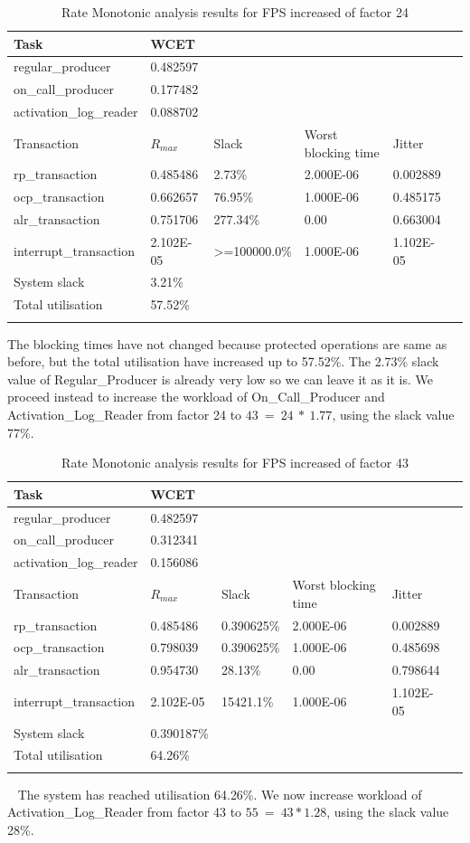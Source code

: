 \documentclass{article}
\begin{document}
\begin{longtable}{llllll}
   \toprule
   Task & WCET \\
   \midrule
   regular\_producer & 0.482597 \\
   on\_call\_producer & 0.177482 \\
   activation\_log\_reader & 0.088702 \\
   \toprule
   \toprule
   Transaction & $R_{max}$ & Slack & Worst blocking time & Jitter \\
   \midrule
   rp\_transaction & 0.485486  & 2.73\% &  2.000E-06 & 0.002889 \\
   ocp\_transaction & 0.662657 & 76.95\% & 1.000E-06 & 0.485175 \\
   alr\_transaction & 0.751706 & 277.34\% & 0.00 & 0.663004 \\
   interrupt\_transaction & 2.102E-05 & >=100000.0\% & 1.000E-06 & 1.102E-05 \\
   \toprule
   \toprule
   System slack & 3.21\% \\
   Total utilisation & 57.52\% \\
   \bottomrule
   \caption{Rate Monotonic analysis results for FPS increased of factor 24}
\label{tab:rm-fps-24}
\end{longtable}

The blocking times have not changed because protected operations are same as before, but the total utilisation have increased up to 57.52\%. The 2.73\% slack value of Regular\_Producer is already very low so we can leave it as it is. We proceed instead to increase the workload of On\_Call\_Producer and Activation\_Log\_Reader from factor 24 to $43\ =\ 24\ *\ 1.77$, using the slack value 77\%.

\begin{longtable}{llllll}
   \toprule
   Task & WCET \\
   \midrule
   regular\_producer & 0.482597 \\
   on\_call\_producer & 0.312341 \\
   activation\_log\_reader & 0.156086 \\
   \toprule
   \toprule
   Transaction & $R_{max}$ & Slack & Worst blocking time & Jitter \\
   \midrule
   rp\_transaction & 0.485486  & 0.390625\% &  2.000E-06 & 0.002889 \\
   ocp\_transaction & 0.798039 & 0.390625\% & 1.000E-06 & 0.485698 \\
   alr\_transaction & 0.954730 & 28.13\% & 0.00 & 0.798644 \\
   interrupt\_transaction & 2.102E-05 & 15421.1\% & 1.000E-06 & 1.102E-05 \\
   \toprule
   \toprule
   System slack & 0.390187\% \\
   Total utilisation & 64.26\% \\
   \bottomrule
   \caption{Rate Monotonic analysis results for FPS increased of factor 43}
\label{tab:rm-fps-24-ocp-44}
\end{longtable}
 
The system has reached utilisation 64.26\%. We now increase workload of Activation\_Log\_Reader from factor 43 to $55\ =\ 43 * 1.28$, using the slack value 28\%.
\end{document}
